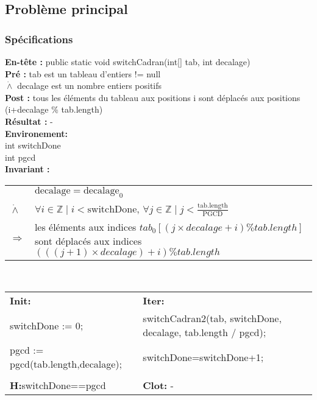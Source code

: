 \subsection{Problème principal}
\subsubsection*{Spécifications}
\noindent \textbf{En-tête :} public static void switchCadran(int[] tab, int decalage)\\
\noindent \textbf{Pré :} tab est un tableau d'entiers != null\\
\indent $\dot{\wedge}$ decalage est un nombre entiers positifs\\
\textbf{Post :} tous les éléments du tableau aux positions i sont déplacés aux positions (i+decalage \% tab.length)\\
\textbf{Résultat :} - \\

\noindent \textbf{Environement: }\\
int switchDone\\
int pgcd\\

\noindent \textbf{Invariant :}

\begin{tabular}{lp{14cm}}

& $\mathrm{decalage}=\mathrm{decalage}_{0}$ \\
$\dot{\wedge}$ & $\forall i \in \mathbb{Z} \mid i < \mathrm{switchDone} $, $\forall j \in \mathbb{Z} \mid j < \frac{\mathrm{tab.length}}{\mathrm{PGCD}}$ \\
$\Rightarrow$ & les éléments aux indices $tab_{0}[(j \times decalage + i) \% tab.length]$ sont déplacés aux indices $(((j+1)\times decalage)+i) \% tab.length$ \\
\end{tabular}\\

\noindent \begin{tabular}{ll}
\textbf{Init: } & \textbf{Iter: }\\
switchDone := 0; & switchCadran2(tab, switchDone, decalage, tab.length / pgcd); \\
pgcd := pgcd(tab.length,decalage); & switchDone=switchDone+1;\\
 & \\
\textbf{H:}switchDone==pgcd & \textbf{Clot: } -\\
\end{tabular}\\

